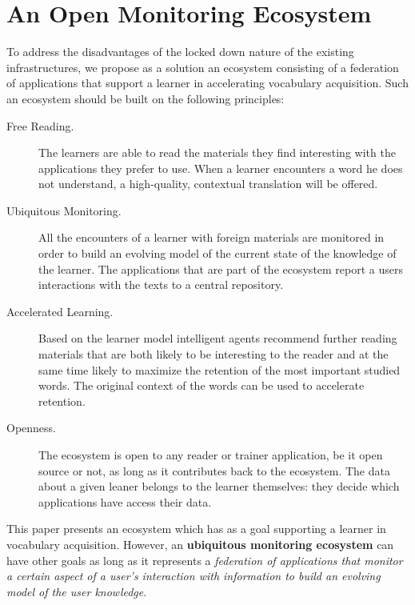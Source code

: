 

\section {An Open Monitoring Ecosystem}

To address the disadvantages of the locked down nature of the existing infrastructures, we propose as a solution an ecosystem consisting of a federation of applications that support a learner in accelerating vocabulary acquisition. Such an ecosystem should be built on the following principles:

\begin{description}

	\item [Free Reading.] The learners are able to read the materials they find interesting with the applications they prefer to use. When a learner encounters a word he does not understand, a high-quality, contextual translation will be offered.

	\item [Ubiquitous Monitoring.] All the encounters of a learner with foreign materials are monitored in order to build an evolving model of the current state of the knowledge of the learner. The applications that are part of the ecosystem report a users interactions with the texts to a central repository.

	\item [Accelerated Learning.] Based on the learner model intelligent agents recommend further reading materials that are both likely to be interesting to the reader and at the same time likely to maximize the retention of the most important studied words. 
	The original context of the words can be used to accelerate retention.

	\item [Openness.] The ecosystem is open to any reader or trainer application, be it open source or not, as long as it contributes back to the ecosystem. The data about a given leaner belongs to the learner themselves: they decide which applications have access their data.

\end{description}

This paper presents an ecosystem which has as a goal supporting a learner in vocabulary acquisition. However, an {\bf ubiquitous monitoring ecosystem} can have other goals as long as it represents a {\em 
	federation of applications 
		that 
			monitor a certain aspect of a user's interaction with information
			to build an evolving model of the user knowledge}.

